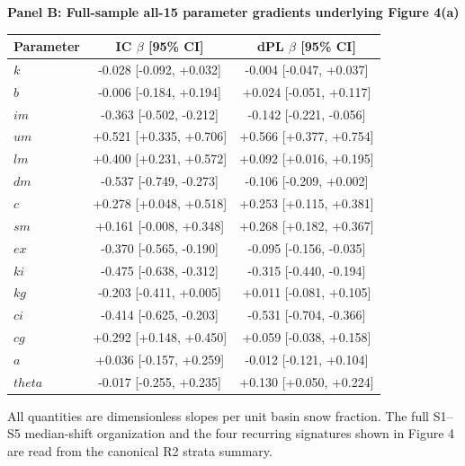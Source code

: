 \begin{table}[t]
\begin{threeparttable}
\medskip
\textbf{Panel B: Full-sample all-15 parameter gradients underlying Figure 4(a)}
\begin{tabular}{lcc}
\toprule
Parameter & IC $\beta$ [95\% CI] & dPL $\beta$ [95\% CI] \\
\midrule
$k$ & -0.028 [-0.092, +0.032] & -0.004 [-0.047, +0.037] \\
$b$ & -0.006 [-0.184, +0.194] & +0.024 [-0.051, +0.117] \\
$im$ & -0.363 [-0.502, -0.212] & -0.142 [-0.221, -0.056] \\
$um$ & +0.521 [+0.335, +0.706] & +0.566 [+0.377, +0.754] \\
$lm$ & +0.400 [+0.231, +0.572] & +0.092 [+0.016, +0.195] \\
$dm$ & -0.537 [-0.749, -0.273] & -0.106 [-0.209, +0.002] \\
$c$ & +0.278 [+0.048, +0.518] & +0.253 [+0.115, +0.381] \\
$sm$ & +0.161 [-0.008, +0.348] & +0.268 [+0.182, +0.367] \\
$ex$ & -0.370 [-0.565, -0.190] & -0.095 [-0.156, -0.035] \\
$ki$ & -0.475 [-0.638, -0.312] & -0.315 [-0.440, -0.194] \\
$kg$ & -0.203 [-0.411, +0.005] & +0.011 [-0.081, +0.105] \\
$ci$ & -0.414 [-0.625, -0.203] & -0.531 [-0.704, -0.366] \\
$cg$ & +0.292 [+0.148, +0.450] & +0.059 [-0.038, +0.158] \\
$a$ & +0.036 [-0.157, +0.259] & -0.012 [-0.121, +0.104] \\
$theta$ & -0.017 [-0.255, +0.235] & +0.130 [+0.050, +0.224] \\
\bottomrule
\end{tabular}

\begin{tablenotes}[flushleft]
\small
\item All quantities are dimensionless slopes per unit basin snow fraction. The full S1--S5 median-shift organization and the four recurring signatures shown in Figure 4 are read from the canonical R2 strata summary.
\end{tablenotes}
\end{threeparttable}
\end{table}

